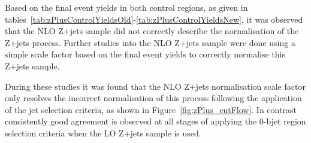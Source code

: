 Based on the final event yields in both control regions, as given in tables~\ref{tab:zPlusControlYieldsOld}-\ref{tab:zPlusControlYieldsNew}, it was observed that the NLO Z+jets sample did not correctly describe the normalisation of the Z+jets process.
Further studies into the NLO Z+jets sample were done using a simple scale factor based on the final event yields to correctly normalise this Z+jets sample.

During these studies it was found that the NLO Z+jets normalisation scale factor only resolves the incorrect normalisation of this process following the application of the jet selection criteria, as shown in Figure~\ref{fig:zPlus_cutFlow}.
In contrast consistently good agreement is observed at all stages of applying the 0-bjet region selection criteria when the LO Z+jets sample is used.


